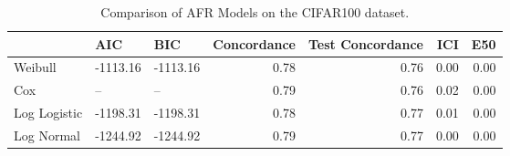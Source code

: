 \begin{table*}
\centering
\caption{Comparison of AFR Models on the CIFAR100 dataset.}
\label{tab:cifar100}
\begin{tabular}{lllrrrr}
\toprule
 & AIC & BIC & Concordance & Test Concordance & ICI & E50 \\
\midrule
Weibull & -1113.16 & -1113.16 & 0.78 & 0.76 & 0.00 & 0.00 \\
Cox & -- & -- & 0.79 & 0.76 & 0.02 & 0.00 \\
Log Logistic & -1198.31 & -1198.31 & 0.78 & 0.77 & 0.01 & 0.00 \\
Log Normal & -1244.92 & -1244.92 & 0.79 & 0.77 & 0.00 & 0.00 \\
\bottomrule
\end{tabular}
\end{table*}
